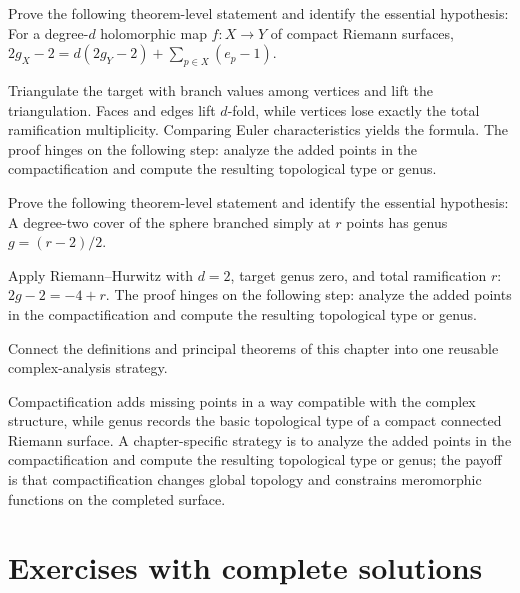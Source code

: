 \begin{problem}\label{prob:iv26-problem-10}
Prove the following theorem-level statement and identify the essential hypothesis: For a degree-$d$ holomorphic map $f:X\to Y$ of compact Riemann surfaces, $2g_X-2=d(2g_Y-2)+\sum_{p\in X}(e_p-1)$.
\end{problem}
\begin{solution}
Triangulate the target with branch values among vertices and lift the triangulation. Faces and edges lift $d$-fold, while vertices lose exactly the total ramification multiplicity. Comparing Euler characteristics yields the formula. The proof hinges on the following step: analyze the added points in the compactification and compute the resulting topological type or genus.
\end{solution}

\begin{problem}\label{prob:iv26-problem-11}
Prove the following theorem-level statement and identify the essential hypothesis: A degree-two cover of the sphere branched simply at $r$ points has genus $g=(r-2)/2$.
\end{problem}
\begin{solution}
Apply Riemann--Hurwitz with $d=2$, target genus zero, and total ramification $r$: $2g-2=-4+r$. The proof hinges on the following step: analyze the added points in the compactification and compute the resulting topological type or genus.
\end{solution}

\begin{problem}\label{prob:iv26-problem-12}
Connect the definitions and principal theorems of this chapter into one reusable complex-analysis strategy.
\end{problem}
\begin{solution}
Compactification adds missing points in a way compatible with the complex structure, while genus records the basic topological type of a compact connected Riemann surface. A chapter-specific strategy is to analyze the added points in the compactification and compute the resulting topological type or genus; the payoff is that compactification changes global topology and constrains meromorphic functions on the completed surface.
\end{solution}

\section{Exercises with complete solutions}

